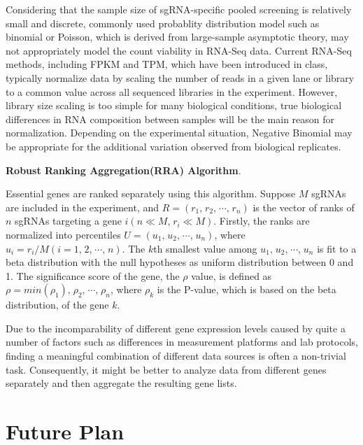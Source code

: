 \documentclass[fleqn,10pt]{wlscirep}
\begin{document}
Considering that the sample size of sgRNA-specific pooled screening is relatively small and discrete, commonly used probablity distribution model such as binomial or Poisson, which is derived from large-sample asymptotic theory, may not appropriately model the count viability in RNA-Seq data.\cite{di2011nbp} Current RNA-Seq methods, including FPKM and TPM, which have been introduced in class, typically normalize data by scaling the number of reads in a given lane or library to a common value across all sequenced libraries in the experiment.  However, library size scaling is too simple for many biological conditions, true biological differences in RNA composition between samples will be the main reason for normalization.  Depending on the experimental situation, Negative Binomial may be appropriate for the additional variation observed from biological replicates\cite{robinson2010scaling}.

\textbf{Robust Ranking Aggregation(RRA) Algorithm}\cite{robinson2010scaling}.

Essential genes are ranked separately using this algorithm.  Suppose $M$ sgRNAs are included in the experiment, and $R=(r_1\textrm{,}\;r_2\textrm{,}\;\cdots \textrm{,}\;r_n)$ is the vector of ranks of $n$ sgRNAs targeting a gene $i(n\ll M\textrm{,}\;r_i\ll M)$.  Firstly, the ranks are normalized into percentiles $U=(u_1\textrm{,}\;u_2\textrm{,}\;\cdots \textrm{,}\;u_n)$, where $u_i=r_i/M(i=1\textrm{,}\;2\textrm{,}\;\cdots\textrm{,}\;n)$. The $k$th smallest value among $u_1\textrm{,}\;u_2\textrm{,}\;\cdots \textrm{,}\;u_n$ is fit to a beta distribution with the null hypotheses as uniform distribution between 0 and 1.  The significance score of the gene, the $\rho$ value, is defined as $\rho=min(\rho_1)\textrm{,}\;\rho_2\textrm{,}\;\cdots \textrm{,}\;\rho_n$, where $\rho_k$ is the P-value, which is based on the beta distribution, of the gene $k$.

Due to the incomparability of different gene expression levels caused by quite a number of factors such as differences in measurement platforms and lab protocols, finding a meaningful combination of different data sources is often a non-trivial task.\cite{doi:10.1093/bioinformatics/btr709}  Consequently, it might be better to analyze data from different genes separately and then aggregate the resulting gene lists. 


\section*{Future Plan}
\end{document}
